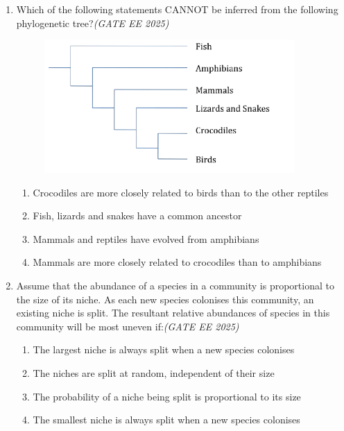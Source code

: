 \documentclass[11pt,a4paper]{article}
\begin{document}
\begin{enumerate}[leftmargin=*,label=\textbf{Q.\arabic*},resume]
\item Which of the following statements CANNOT be inferred from the following phylogenetic tree?\hfill \textit{(GATE EE 2025)}
\vspace{1em}
\begin{figure}[h!]
    \centering
    \includegraphics[width=0.9\textwidth]{imageQ28.png}
\end{figure}
\vspace{1em}
\begin{multicols}{2}
\begin{enumerate}[label=(\Alph*)]
\item Crocodiles are more closely related to birds than to the other reptiles
\item Fish, lizards and snakes have a common ancestor
\item Mammals and reptiles have evolved from amphibians
\item Mammals are more closely related to crocodiles than to amphibians
\end{enumerate}
\end{multicols}

\item Assume that the abundance of a species in a community is proportional to the size of its niche. As each new species colonises this community, an existing niche is split. The resultant relative abundances of species in this community will be most uneven if:\hfill \textit{(GATE EE 2025)}
\begin{multicols}{2}
\begin{enumerate}[label=(\Alph*)]
\item The largest niche is always split when a new species colonises
\item The niches are split at random, independent of their size
\item The probability of a niche being split is proportional to its size
\item The smallest niche is always split when a new species colonises
\end{enumerate}
\end{multicols}

\end{enumerate}
\newpage
{}
\end{document}

